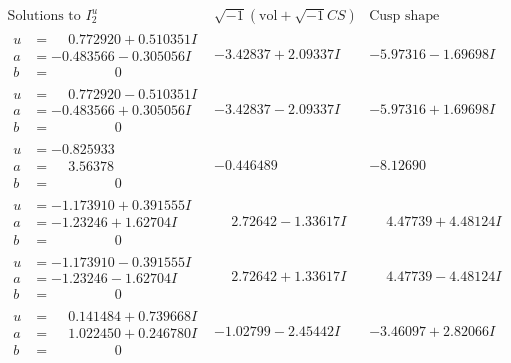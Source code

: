 \documentclass[1p]{elsarticle_modified}
\theoremstyle{definition}
\newcommand{\I}{\sqrt{-1}}
\begin{document}
$$\begin{array}{c|c|c}  
\text{Solutions to }I^u_{2}& \I (\text{vol} + \sqrt{-1}CS) & \text{Cusp shape}\\
 \hline 
\begin{aligned}
u &= \phantom{-}0.772920 + 0.510351 I \\
a &= -0.483566 - 0.305056 I \\
b &= \phantom{-0.000000 } 0\end{aligned}
 & -3.42837 + 2.09337 I & -5.97316 - 1.69698 I \\ \hline\begin{aligned}
u &= \phantom{-}0.772920 - 0.510351 I \\
a &= -0.483566 + 0.305056 I \\
b &= \phantom{-0.000000 } 0\end{aligned}
 & -3.42837 - 2.09337 I & -5.97316 + 1.69698 I \\ \hline\begin{aligned}
u &= -0.825933\phantom{ +0.000000I} \\
a &= \phantom{-}3.56378\phantom{ +0.000000I} \\
b &= \phantom{-0.000000 } 0\end{aligned}
 & -0.446489\phantom{ +0.000000I} & -8.12690\phantom{ +0.000000I} \\ \hline\begin{aligned}
u &= -1.173910 + 0.391555 I \\
a &= -1.23246 + 1.62704 I \\
b &= \phantom{-0.000000 } 0\end{aligned}
 & \phantom{-}2.72642 - 1.33617 I & \phantom{-}4.47739 + 4.48124 I \\ \hline\begin{aligned}
u &= -1.173910 - 0.391555 I \\
a &= -1.23246 - 1.62704 I \\
b &= \phantom{-0.000000 } 0\end{aligned}
 & \phantom{-}2.72642 + 1.33617 I & \phantom{-}4.47739 - 4.48124 I \\ \hline\begin{aligned}
u &= \phantom{-}0.141484 + 0.739668 I \\
a &= \phantom{-}1.022450 + 0.246780 I \\
b &= \phantom{-0.000000 } 0\end{aligned}
 & -1.02799 - 2.45442 I & -3.46097 + 2.82066 I \\ \hline\begin{aligned}

\end{aligned}
\end{array}$$
\end{document}

